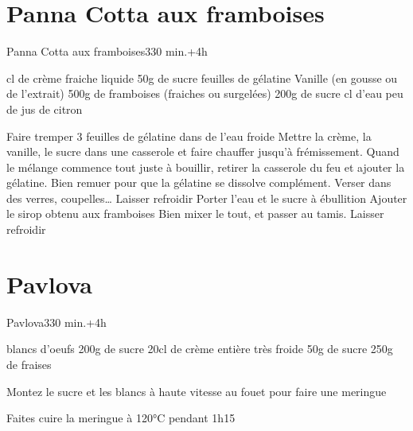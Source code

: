 {\section{Panna Cotta aux framboises}
\begin{recette}{Panna Cotta aux framboises}{3}{30 min.+4h}{}
\begin{ingredients}
 cl de crème fraiche liquide
\ingredient 50g de sucre
 feuilles de gélatine
\ingredient Vanille (en gousse ou de l’extrait)
\ingredient[Coulis]
\ingredient 500g de framboises (fraiches ou surgelées)
\ingredient 200g de sucre
 cl d’eau
 peu de jus de citron
\end{ingredients}

\begin{preparation}
\etape Faire tremper 3 feuilles de gélatine dans de l’eau froide
\etape Mettre la crème, la vanille, le sucre dans une casserole et faire chauffer jusqu’à frémissement.
\etape Quand le mélange commence tout juste à bouillir, retirer la casserole du feu et ajouter la gélatine. Bien remuer pour que 
la gélatine se dissolve complément.
\etape Verser dans des verres, coupelles…
\etape Laisser refroidir
\etape Porter l’eau et le sucre à ébullition
\etape Ajouter le sirop obtenu aux framboises
\etape Bien mixer le tout, et passer au tamis.
\etape Laisser refroidir
\end{preparation}
\end{recette}

\section{Pavlova}
\begin{recette}{Pavlova}{3}{30 min.+4h}{}
\begin{ingredients}
\ingredient[meringue]
 blancs d'oeufs
\ingredient 200g de sucre
\ingredient[chantilly]
\ingredient 20cl de crème entière très froide
\ingredient 50g de sucre
\ingredient[garniture]
\ingredient 250g de fraises
\end{ingredients}

\begin{preparation}
\etape Montez le sucre et les blancs à haute vitesse au fouet pour faire une meringue
\end{preparation}
\begin{cuisson}
Faites cuire la meringue à 120°C pendant 1h15
\end{cuisson}
\end{recette}

}
